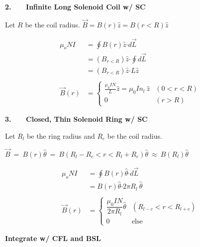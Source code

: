 \documentclass[12pt]{article}
\newcommand*{\dotP}{\boldsymbol \cdot}		%
\begin{document}
\begin{minipage}[t]{0.45\textwidth}
	\textbf{2. \ \ \ Infinite Long Solenoid Coil w/ SC}

	\vspace{10pt}
	Let \(R\) be the coil radius. \( \vec{B} = B(r) \hat{z} = B(r<R) \hat{z} \)

	\vspace{10pt}
	\begin{align*}
		\mu_o NI &= \oint B(r) \hat{z} \dotP d\vec{ L }\\
		&= (B_{r<R}) \hat{z} \dotP \oint d\vec{L}\\
		&= (B_{r<R}) \hat{z} \dotP L \hat{z}\\ \\
		\vec{B}(r) &= \begin{cases}
			\frac{\mu_0 I N}{L} \hat{z} = \mu_0 I n_l \ \hat{z} & (0<r<R) \\
			0 & (r>R)
		\end{cases}
	\end{align*}

	\vspace{10pt}
	\textbf{3. \ \ \ Closed, Thin Solenoid Ring w/ SC}

	\vspace{10pt}
	Let \(R_l\) be the ring radius and \(R_c\) be the coil radius.

	\vspace{10pt}
	\( 
		\vec{B} \ = \ B(r) \hat{ \theta } 
		\ = \ B({\scriptstyle R_l-R_c < r < R_l+R_c}) \hat{ \theta } 
		\ \approx \ B( R_l ) \hat{ \theta }
	\)

	\vspace{5pt}
	\begin{align*}
		\mu_o NI &= \oint B(r) \hat{ \theta } \dotP d\vec{ L }\\
		&= B(r) \hat{ \theta } \dotP 2 \pi R_l \ \hat{ \theta }\\ \\
		\vec{B}(r) &= \begin{cases} 
			\dfrac{\mu_0 I N}{2 \pi R_l} \hat{ \theta } & (R_{l-c}<r<R_{l+c}) \\
			0 & \text{else}
		\end{cases}
	\end{align*}
\end{minipage}

%
%
%
\newpage 
\noindent

\textbf{Integrate w/ CFL and BSL}
\end{document}
